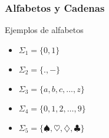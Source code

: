 \begin{frame}
  \frametitle{Alfabetos y Cadenas}
      \begin{block}{Ejemplos de alfabetos}
\begin{itemize}[<+->]
\item $\Sigma_1 = \{0, 1\}$ 
\item $\Sigma_2 = \{., -\}$
\item $\Sigma_3 = \{a, b, c, ..., z\}$
\item $\Sigma_4 = \{0, 1, 2, \ldots, 9\}$
\item $\Sigma_5 = \{\spadesuit, \heartsuit, \diamondsuit, \clubsuit\}$
\end{itemize}
		\end{block}
\end{frame}
